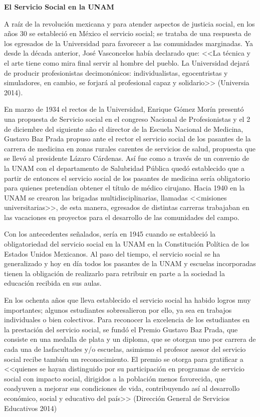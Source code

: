 \bigskip
\textbf{El Servicio Social  en la UNAM}
\enlargethispage{1\baselineskip}

A raíz de la revolución mexicana y para atender aspectos de justicia social,
en los años 30 se estableció en México el servicio social; se trataba de
una respuesta de los egresados de la Universidad para favorecer a las
comunidades marginadas. Ya desde la década anterior, José Vasconcelos había
declarado que: <<La técnica y el arte tiene  como mira final servir al
hombre del pueblo. La Universidad dejará de producir profesionistas
decimonónicos: individualistas, egocentristas y simuladores, en cambio, se
forjará al profesional capaz y solidario>> (Universia 2014).


En marzo de 1934 el rectos de la Universidad, Enrique Gómez Morín presentó
una propuesta de Servicio social en el congreso Nacional de Profesionistas
y el 2 de diciembre del siguiente año el director de la Escuela Nacional de
Medicina, Gustavo Baz Prada propuso ante el rector  el servicio social de
los pasantes de la carrera de medicina en zonas rurales carentes de
servicios de salud, propuesta que se llevó al presidente Lázaro Cárdenas. 
Así fue como a través de un convenio de la UNAM con el departamento de
Salubridad Pública quedó establecido que a partir de entonces el servicio
social de los pasantes de medicina sería obligatorio para quienes
pretendían obtener el título de médico cirujano. Hacia 1940 en la UNAM se
crearon las brigadas multidisciplinarias, llamadas <<misiones
universitarias>>,  de esta manera, egresados de distintas carreras
trabajaban en las vacaciones en proyectos para el desarrollo de las
comunidades del campo.

Con los antecedentes señalados, sería en 1945 cuando se estableció la
obligatoriedad del servicio social en la UNAM en la Constitución Política
de los Estados Unidos Mexicanos. Al paso del tiempo, el servicio social se
ha generalizado y hoy en día todos los pasantes de la UNAM y escuelas
incorporadas tienen la obligación de realizarlo para retribuir en parte a
la sociedad la educación recibida en sus aulas.

En los ochenta años que lleva establecido el servicio social ha habido
logros muy importantes; algunos estudiantes sobresalieron por ello, ya sea
en trabajos individuales o bien colectivos. Para reconocer la excelencia de
los estudiantes en la prestación del servicio social, se fundó el Premio
Gustavo Baz Prada, que consiste en una medalla de plata y un diploma, que
se otorgan uno por carrera de cada una de las\linebreak facultades y/o escuelas,
asimismo el profesor asesor del servicio social recibe también un
reconocimiento. El premio se otorga para gratificar a <<quienes se hayan
distinguido por su participación en programas de servicio social con
impacto social, dirigidos a la población menos favorecida, que coadyuven a
mejorar sus condiciones de vida, contribuyendo así al desarrollo económico,
social y educativo del país>> (Dirección General de Servicios Educativos
2014) 


